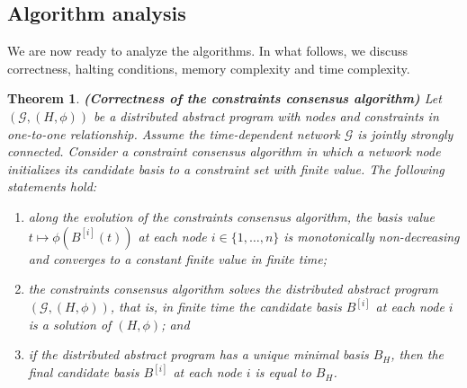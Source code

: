 \documentclass[onecolumn,journal,letterpaper]{IEEEtran}
\newcommand{\GG}{\mathcal{G}}
\newcommand{\until}[1]{\{1,\dots,#1\}}
\newcommand{\supind}[2]{{#1}^{[#2]}}
\newtheorem{theorem}{Theorem}[section]
\begin{document}
\subsection{Algorithm analysis}
We are now ready to analyze the algorithms. In what follows, we
discuss correctness, halting conditions, memory complexity and time
complexity.

\begin{theorem}\textbf{\textup{(Correctness of the constraints consensus
      algorithm)}}
  \label{thm:correctness-of-constraints-consensus}
  Let $(\GG,(H,\phi))$ be a distributed abstract program with nodes and
  constraints in one-to-one relationship. Assume the time-dependent network
  $\GG$ is jointly strongly connected. Consider a constraint consensus
  algorithm in which a network node initializes its candidate basis to a
  constraint set with finite value.  The following statements hold:
  \begin{enumerate}
  \item\label{fact:monotonicity} along the evolution of the constraints
    consensus algorithm, the basis value $t\mapsto \phi(\supind{B}{i}(t))$
    at each node $i\in\until{n}$ is monotonically non-decreasing and
    converges to a constant finite value in finite time;

  \item\label{fact:convergence} the constraints consensus algorithm solves
    the distributed abstract program $(\GG,(H,\phi))$, that is, in
    finite time the candidate basis $\supind{B}{i}$ at each node $i$ is a
    solution of $(H,\phi)$; and

  \item\label{fact:uniqueness} if the distributed abstract program has a
    unique minimal basis $B_H$, then the final candidate basis
    $\supind{B}{i}$ at each node $i$ is equal to $B_H$.
  \end{enumerate}
\end{theorem}
\end{document}
